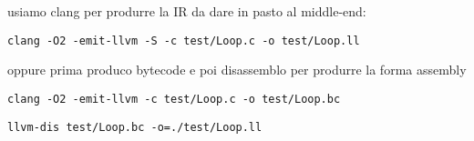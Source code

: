 \begin{emphasize}
    usiamo clang per produrre la IR da dare in pasto al middle-end:

    \lstinline|clang -O2 -emit-llvm -S -c test/Loop.c -o test/Loop.ll|

    oppure prima produco bytecode e poi disassemblo per produrre la forma assembly

    \lstinline|clang -O2 -emit-llvm -c test/Loop.c -o test/Loop.bc|

    \lstinline|llvm-dis test/Loop.bc -o=./test/Loop.ll|
\end{emphasize}



